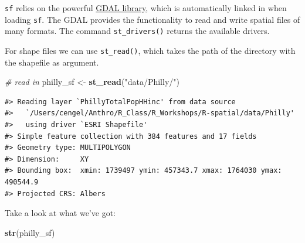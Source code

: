 \documentclass[
]{book}
\newenvironment{Shaded}{\begin{snugshade}}{\end{snugshade}}
\newcommand{\CommentTok}[1]{\textcolor[rgb]{0.56,0.35,0.01}{\textit{#1}}}
\newcommand{\FunctionTok}[1]{\textcolor[rgb]{0.13,0.29,0.53}{\textbf{#1}}}
\newcommand{\NormalTok}[1]{#1}
\newcommand{\OtherTok}[1]{\textcolor[rgb]{0.56,0.35,0.01}{#1}}
\newcommand{\StringTok}[1]{\textcolor[rgb]{0.31,0.60,0.02}{#1}}
\begin{document}
\texttt{sf} relies on the powerful \href{http://gdal.org}{GDAL library}, which is automatically linked in when loading \texttt{sf}. The GDAL provides the functionality to read and write spatial files of many formats. The command \texttt{st\_drivers()} returns the available drivers.

For shape files we can use \texttt{st\_read()}, which takes the path of the directory with the shapefile as argument.

\begin{Shaded}
\begin{Highlighting}[]
\CommentTok{\# read in}
\NormalTok{philly\_sf }\OtherTok{\textless{}{-}} \FunctionTok{st\_read}\NormalTok{(}\StringTok{"data/Philly/"}\NormalTok{)}
\end{Highlighting}
\end{Shaded}

\begin{verbatim}
#> Reading layer `PhillyTotalPopHHinc' from data source 
#>   `/Users/cengel/Anthro/R_Class/R_Workshops/R-spatial/data/Philly' 
#>   using driver `ESRI Shapefile'
#> Simple feature collection with 384 features and 17 fields
#> Geometry type: MULTIPOLYGON
#> Dimension:     XY
#> Bounding box:  xmin: 1739497 ymin: 457343.7 xmax: 1764030 ymax: 490544.9
#> Projected CRS: Albers
\end{verbatim}

Take a look at what we've got:

\begin{Shaded}
\begin{Highlighting}[]
\FunctionTok{str}\NormalTok{(philly\_sf) }
\end{Highlighting}
\end{Shaded}
\end{document}
